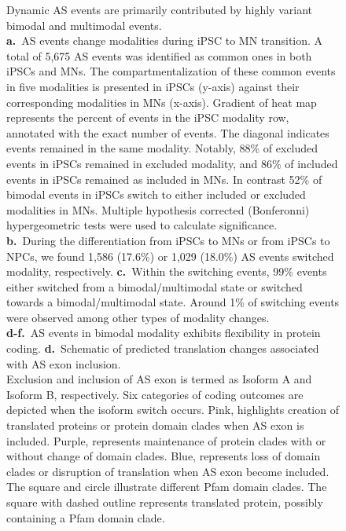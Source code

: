 \clearpage
\thispagestyle{facingcaption}
\begin{figure}[h]
\captionsetup{labelformat=prev-page}
\caption[Dynamic AS events are primarily contributed by highly variant bimodal and multimodal events.]{Dynamic AS events are primarily contributed by highly variant bimodal and multimodal events.\\
\textbf{a.}~AS events change modalities during iPSC to MN transition. A total of 5,675 AS events was identified as common ones in both iPSCs and MNs. The compartmentalization of these common events in five modalities is presented in iPSCs (y-axis) against their corresponding modalities in MNs (x-axis). Gradient of heat map represents the percent of events in the iPSC modality row, annotated with the exact number of events. The diagonal indicates events remained in the same modality. Notably, 88\% of excluded events in iPSCs remained in excluded modality, and 86\% of included events in iPSCs remained as included in MNs. In contrast 52\% of bimodal events in iPSCs switch to either included or excluded modalities in MNs. Multiple hypothesis corrected (Bonferonni) hypergeometric tests were used to calculate significance.\\
\textbf{b.}~During the differentiation from iPSCs to MNs or from iPSCs to NPCs, we found 1,586 (17.6\%) or 1,029 (18.0\%) AS events switched modality, respectively.
\textbf{c.}~Within the switching events, 99\% events either switched from a bimodal/multimodal state or switched towards a bimodal/multimodal state. Around 1\% of switching events were observed among other types of modality changes.\\
\textbf{d-f.}~AS events in bimodal modality exhibits flexibility in protein coding.
\textbf{d.}~Schematic of predicted translation changes associated with AS exon inclusion.\\ Exclusion and inclusion of AS exon is termed as Isoform A and Isoform B, respectively. Six categories of coding outcomes are depicted when the isoform switch occurs. Pink, highlights creation of translated proteins or protein domain clades when AS exon is included. Purple, represents maintenance of protein clades with or without change of domain clades. Blue, represents loss of domain clades or disruption of translation when AS exon become included. The square and circle illustrate different Pfam domain clades. The square with dashed outline represents translated protein, possibly containing a Pfam domain clade.\\
}
\end{figure}
